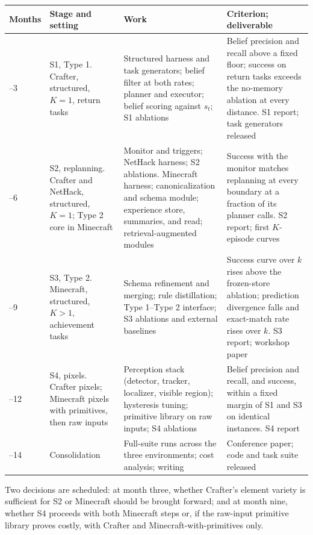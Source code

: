 \documentclass[10pt]{article}
\begin{document}
{\small
\begin{longtable}{@{}>{\raggedright\arraybackslash}p{}>{\raggedright\arraybackslash}p{}>{\raggedright\arraybackslash}p{}>{\raggedright\arraybackslash}p{}@{}}
\toprule
Months & Stage and setting & Work & Criterion; deliverable \\
\midrule
\endhead
1--3 & S1, Type 1. Crafter, structured, $K=1$, return tasks & Structured harness and task generators; belief filter at both rates; planner and executor; belief scoring against $s_t$; S1 ablations & Belief precision and recall above a fixed floor; success on return tasks exceeds the no-memory ablation at every distance. S1 report; task generators released \\
4--6 & S2, replanning. Crafter and NetHack, structured, $K=1$; Type 2 core in Minecraft & Monitor and triggers; NetHack harness; S2 ablations. Minecraft harness; canonicalization and schema module; experience store, summaries, and read; retrieval-augmented modules & Success with the monitor matches replanning at every boundary at a fraction of its planner calls. S2 report; first $K$-episode curves \\
7--9 & S3, Type 2. Minecraft, structured, $K>1$, achievement tasks & Schema refinement and merging; rule distillation; Type 1--Type 2 interface; S3 ablations and external baselines & Success curve over $k$ rises above the frozen-store ablation; prediction divergence falls and exact-match rate rises over $k$. S3 report; workshop paper \\
10--12 & S4, pixels. Crafter pixels; Minecraft pixels with primitives, then raw inputs & Perception stack (detector, tracker, localizer, visible region); hysteresis tuning; primitive library on raw inputs; S4 ablations & Belief precision and recall, and success, within a fixed margin of S1 and S3 on identical instances. S4 report \\
13--14 & Consolidation & Full-suite runs across the three environments; cost analysis; writing & Conference paper; code and task suite released \\
\bottomrule
\end{longtable}}

Two decisions are scheduled: at month three, whether Crafter's element variety is sufficient for S2 or Minecraft should be brought forward; and at month nine, whether S4 proceeds with both Minecraft steps or, if the raw-input primitive library proves costly, with Crafter and Minecraft-with-primitives only.
\end{document}
